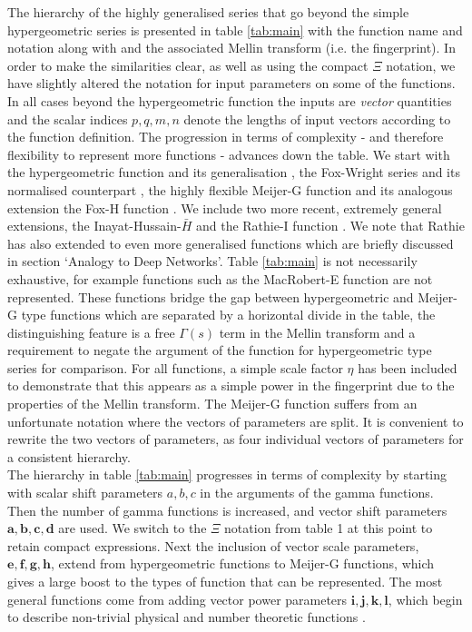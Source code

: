 \documentclass{article}
\begin{document}
The hierarchy of the highly generalised series that go beyond the simple hypergeometric series is presented in table \ref{tab:main} with the function name and notation along with and the associated Mellin transform (i.e. the fingerprint). In order to make the similarities clear, as well as using the compact $\Xi$ notation, we have slightly altered the notation for input parameters on some of the functions. In all cases beyond the hypergeometric function the inputs are \emph{vector} quantities and the scalar indices $p,q,m,n$ denote the lengths of input vectors according to the function definition. The progression in terms of complexity - and therefore flexibility to represent more functions - advances down the table. We start with the hypergeometric function \cite{Kolbig1995,Fikioris2006} and its generalisation \cite{Kolbig1995}, the Fox-Wright series and its normalised counterpart \cite{Wright1935}, the highly flexible Meijer-G function \cite{Bateman1953} and its analogous extension the Fox-H function \cite{Fox1961}. We include two more recent, extremely general extensions, the Inayat-Hussain-$\bar{H}$ \cite{Inayat-Hussain1987} and the Rathie-I function \cite{Rathie1997}. We note that Rathie has also extended to even more generalised functions \cite{Rathie2013} which are briefly discussed in section `Analogy to Deep Networks'. Table \ref{tab:main} is not necessarily exhaustive, for example functions such as the MacRobert-E function \cite{MacRobert1962} are not represented. These functions bridge the gap between hypergeometric and Meijer-G type functions which are separated by a horizontal divide in the table, the distinguishing feature is a free $\Gamma(s)$ term in the Mellin transform and a requirement to negate the argument of the function for hypergeometric type series for comparison. For all functions, a simple scale factor $\eta$ has been included to demonstrate that this appears as a simple power in the fingerprint due to the properties of the Mellin transform. The Meijer-G function suffers from an unfortunate notation where the vectors of parameters are split. It is convenient to rewrite the two vectors of parameters, as four individual vectors of parameters for a consistent hierarchy.\\

The hierarchy in table \ref{tab:main} progresses in terms of complexity by starting with scalar shift parameters $a,b,c$ in the arguments of the gamma functions. Then the number of gamma functions is increased, and vector shift parameters $\mathbf{a,b,c,d}$ are used. We switch to the $\Xi$ notation from table 1 at this point to retain compact expressions. Next the inclusion of vector scale parameters, $\mathbf{e,f,g,h}$, extend from hypergeometric functions to Meijer-G functions, which gives a large boost to the types of function that can be represented. The most general functions come from adding vector power parameters $\mathbf{i,j,k,l}$, which begin to describe non-trivial physical and number theoretic functions \cite{Rathie1997}.
\end{document}
